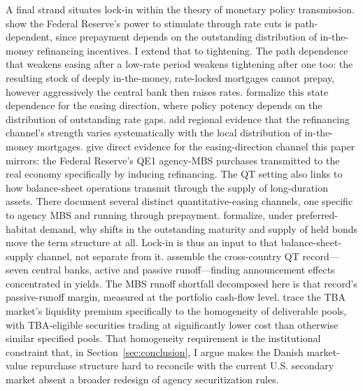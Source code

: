 \documentclass[12pt]{article}
\begin{document}
A final strand situates lock-in within the theory of monetary policy transmission. \citet{berger2021} show the Federal Reserve's power to stimulate through rate cuts is path-dependent, since prepayment depends on the outstanding distribution of in-the-money refinancing incentives. I extend that to tightening. The path dependence that weakens easing after a low-rate period weakens tightening after one too: the resulting stock of deeply in-the-money, rate-locked mortgages cannot prepay, however aggressively the central bank then raises rates. \citet{eichenbaum2022} formalize this state dependence for the easing direction, where policy potency depends on the distribution of outstanding rate gaps. \citet{beraja2019} add regional evidence that the refinancing channel's strength varies systematically with the local distribution of in-the-money mortgages. \citet{dimaggio2020} give direct evidence for the easing-direction channel this paper mirrors: the Federal Reserve's QE1 agency-MBS purchases transmitted to the real economy specifically by inducing refinancing. The QT setting also links to how balance-sheet operations transmit through the supply of long-duration assets. There \citet{krishnamurthy2011} document several distinct quantitative-easing channels, one specific to agency MBS and running through prepayment. \citet{vayanos2021} formalize, under preferred-habitat demand, why shifts in the outstanding maturity and supply of held bonds move the term structure at all. Lock-in is thus an input to that balance-sheet-supply channel, not separate from it. \citet{du2024} assemble the cross-country QT record---seven central banks, active and passive runoff---finding announcement effects concentrated in yields. The MBS runoff shortfall decomposed here is that record's passive-runoff margin, measured at the portfolio cash-flow level. \citet{vickery2013} trace the TBA market's liquidity premium specifically to the homogeneity of deliverable pools, with TBA-eligible securities trading at significantly lower cost than otherwise similar specified pools. That homogeneity requirement is the institutional constraint that, in Section~\ref{sec:conclusion}, I argue makes the Danish market-value repurchase structure hard to reconcile with the current U.S. secondary market absent a broader redesign of agency securitization rules.
\end{document}
